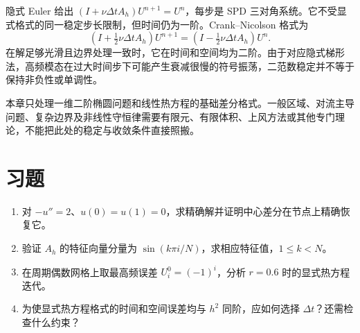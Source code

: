 隐式 Euler 给出 $(I+\nu\Delta t A_h)U^{n+1}=U^n$，每步是 SPD 三对角系统。它不受显式格式的同一稳定步长限制，但时间仍为一阶。Crank--Nicolson 格式为
\[
 (I+\tfrac12\nu\Delta t A_h)U^{n+1}
 =(I-\tfrac12\nu\Delta t A_h)U^n.
\]
在解足够光滑且边界处理一致时，它在时间和空间均为二阶。由于对应隐式梯形法，高频模态在过大时间步下可能产生衰减很慢的符号振荡，二范数稳定并不等于保持非负性或单调性。

本章只处理一维二阶椭圆问题和线性热方程的基础差分格式。一般区域、对流主导问题、复杂边界及非线性守恒律需要有限元、有限体积、上风方法或其他专门理论，不能把此处的稳定与收敛条件直接照搬。

\section{习题}
\begin{enumerate}[label=\arabic*.]
\item\label{exr:na-pde-exact} 对 $-u''=2$、$u(0)=u(1)=0$，求精确解并证明中心差分在节点上精确恢复它。
\item\label{exr:na-pde-spectrum} 验证 $A_h$ 的特征向量分量为 $\sin(k\pi i/N)$，求相应特征值，$1\le k<N$。
\item\label{exr:na-pde-stability} 在周期偶数网格上取最高频误差 $U_i^0=(-1)^i$，分析 $r=0.6$ 时的显式热方程迭代。
\item\label{exr:na-pde-mesh} 为使显式热方程格式的时间和空间误差均与 $h^2$ 同阶，应如何选择 $\Delta t$？还需检查什么约束？
\end{enumerate}

